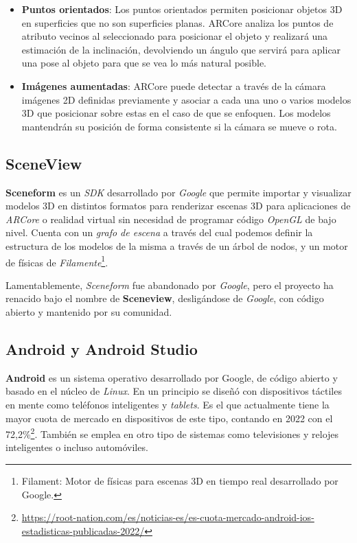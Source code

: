 \begin{itemize}
    \item \textbf{Puntos orientados}: Los puntos orientados permiten posicionar objetos 3D en superficies que no son superficies planas. ARCore analiza los puntos de atributo vecinos al seleccionado para posicionar el objeto y realizará una estimación de la inclinación, devolviendo un ángulo que servirá para aplicar una pose al objeto para que se vea lo más natural posible.

    \item \textbf{Imágenes aumentadas}: ARCore puede detectar a través de la cámara imágenes 2D definidas previamente y asociar a cada una uno o varios modelos 3D que posicionar sobre estas en el caso de que se enfoquen. Los modelos mantendrán su posición de forma consistente si la cámara se mueve o rota.

\end{itemize}

\subsection{SceneView}

\textbf{Sceneform} es un \textit{SDK} desarrollado por \textit{Google} que permite importar y visualizar modelos 3D en distintos formatos para renderizar escenas 3D para aplicaciones de \textit{ARCore} o realidad virtual sin necesidad de programar código \textit{OpenGL} de bajo nivel. Cuenta con un \textit{grafo de escena} a través del cual podemos definir la estructura de los modelos de la misma a través de un árbol de nodos, y un motor de físicas de \textit{Filamente}\footnote{Filament: Motor de físicas para escenas 3D en tiempo real desarrollado por Google.}.

Lamentablemente, \textit{Sceneform} fue abandonado por \textit{Google}, pero el proyecto ha renacido bajo el nombre de \textbf{Sceneview}\cite{sceneview}, desligándose de \textit{Google}, con código abierto y mantenido por su comunidad.

\subsection{Android y Android Studio}

\textbf{Android} es un sistema operativo desarrollado por Google, de código abierto y basado en el núcleo de \textit{Linux}. En un principio se diseñó con dispositivos táctiles en mente como teléfonos inteligentes y \textit{tablets}. Es el que actualmente tiene la mayor cuota de mercado en dispositivos de este tipo, contando en 2022 con el 72,2\%\footnote{\url{https://root-nation.com/es/noticias-es/es-cuota-mercado-android-ios-estadisticas-publicadas-2022/}}. También se emplea en otro tipo de sistemas como televisiones y relojes inteligentes o incluso automóviles.

